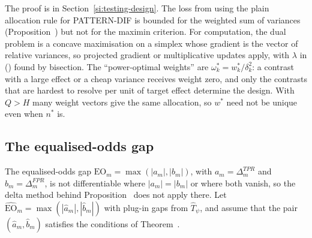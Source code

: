 The proof is in Section~\ref{si:testing-design}. The loss from using the plain allocation rule for PATTERN-DIF is bounded for the weighted sum of variances (Proposition~) but not for the maximin criterion. For computation, the dual problem is a concave maximisation on a simplex whose gradient is the vector of relative variances, so projected gradient or multiplicative updates apply, with $\lambda$ in () found by bisection. The ``power-optimal weights'' are $\omega^\ast_k=w^\ast_k/\delta_k^2$: a contrast with a large effect or a cheap variance receives weight zero, and only the contrasts that are hardest to resolve per unit of target effect determine the design. With $Q>H$ many weight vectors give the same allocation, so $w^\ast$ need not be unique even when $n^\ast$ is.

\subsection{The equalised-odds gap}\label{si:testing-eo-stmt}

The equalised-odds gap $\mathrm{EO}_m=\max(|a_m|,|b_m|)$, with $a_m=\Delta^{TPR}_m$ and $b_m=\Delta^{FPR}_m$, is not differentiable where $|a_m|=|b_m|$ or where both vanish, so the delta method behind Proposition~ does not apply there. Let $\widehat{\mathrm{EO}}_m=\max(|\hat a_m|,|\hat b_m|)$ with plug-in gaps from $\hat T_\psi$, and assume that the pair $(\hat a_m,\hat b_m)$ satisfies the conditions of Theorem~.

